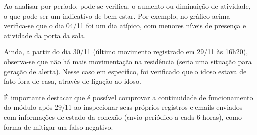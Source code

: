 Ao analisar por período, pode-se verificar o aumento ou diminuição de atividade, o que pode ser um indicativo de bem-estar. Por exemplo, no gráfico acima verifica-se que o dia 04/11 foi um dia atípico, com menores níveis de presença e atividade da porta da sala.

Ainda, a partir do dia 30/11 (último movimento registrado em 29/11 às 16h20), observa-se que não há mais movimentação na residência (seria uma situação para geração de alerta). Nesse caso em específico, foi verificado que o idoso estava de fato fora de casa, através de ligação ao idoso.

É importante destacar que é possível comprovar a continuidade de funcionamento do módulo após 29/11 ao inspecionar seus próprios registros e emails enviados com informações de estado da conexão (envio periódico a cada 6 horas), como forma de mitigar um falso negativo.